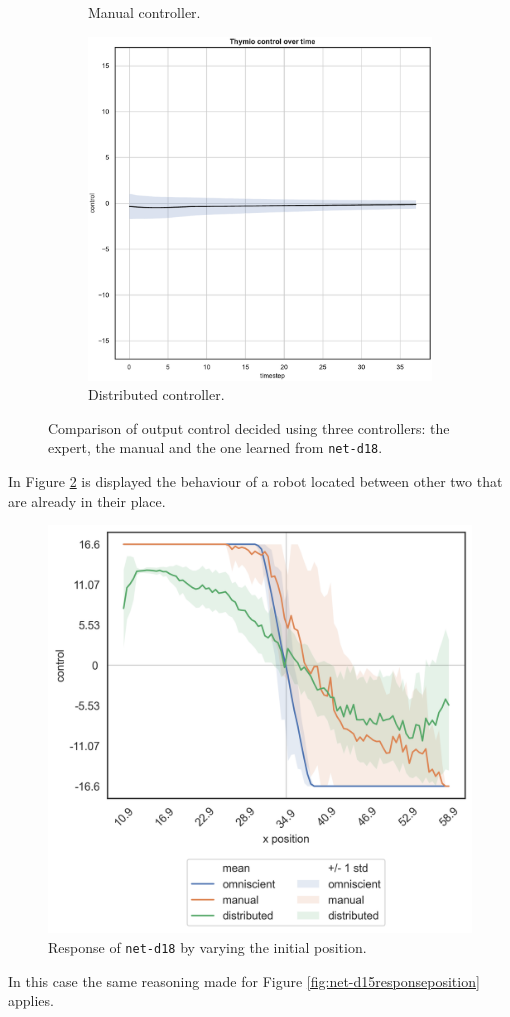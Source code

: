 \begin{figure}[!htb]
\begin{subfigure}[h]{0.3\textwidth}
		\caption{Manual controller.}
	\end{subfigure}
	\hfill
	\begin{subfigure}[h]{0.3\textwidth}
		\centering
		\includegraphics[width=\textwidth]{contents/images/net-d18/control-overtime-learned_distributed}
		\caption{Distributed controller.}
	\end{subfigure}
	\caption[Evaluation of the control decided by \texttt{net-d18}.]{Comparison 
		of output control decided using three controllers: the expert, the manual and 
		the one learned from \texttt{net-d18}.}
	\label{fig:net-d18control}
\end{figure}


In Figure \ref{fig:net-d18responseposition} is displayed the behaviour of a robot 
located between other two that are already in their place.
\begin{figure}[!htb]
	\centering
	\includegraphics[width=.45\textwidth]{contents/images/net-d18/response-varying_init_position-distributed}%
	\caption{Response of \texttt{net-d18} by varying the initial position.}
	\label{fig:net-d18responseposition}
\end{figure}
In this case the same reasoning made for Figure 
\ref{fig:net-d15responseposition} applies.

